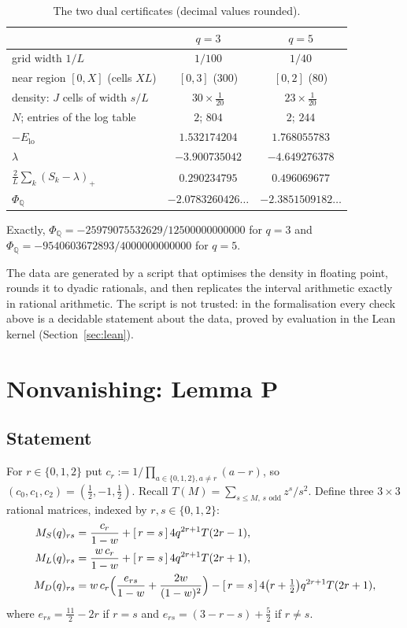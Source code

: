 \documentclass[11pt]{amsart}
\theoremstyle{definition}
\theoremstyle{remark}
\numberwithin{equation}{section}
\newcommand{\ind}[1]{[\,#1\,]}
\begin{document}
\begin{table}[ht]
\centering
\begin{tabular}{@{}lcc@{}}
\toprule
 & $q=3$ & $q=5$\\
\midrule
grid width $1/L$ & $1/100$ & $1/40$\\
near region $[0,X]$ (cells $XL$) & $[0,3]$ ($300$) & $[0,2]$ ($80$)\\
density: $J$ cells of width $s/L$ & $30\times\frac1{20}$ & $23\times\frac1{20}$\\
$N$; entries of the log table & $2$; $804$ & $2$; $244$\\
$-E_{\mathrm{lo}}$ & $1.532174204$ & $1.768055783$\\
$\lambda$ & $-3.900735042$ & $-4.649276378$\\
$\frac2L\sum_k(S_k-\lambda)_+$ & $0.290234795$ & $0.496069677$\\
$\Phi_{\mathbb Q}$ & $-2.0783260426\ldots$ & $-2.3851509182\ldots$\\
\bottomrule
\end{tabular}
\caption{The two dual certificates (decimal values rounded).}\label{tab:cert}
\end{table}

Exactly, $\Phi_{\mathbb Q}=-25979075532629/12500000000000$ for $q=3$ and $\Phi_{\mathbb Q}=-9540603672893/4000000000000$
for $q=5$.

The data are generated by a script that optimises the density in floating point, rounds it to dyadic rationals,
and then replicates the interval arithmetic exactly in rational arithmetic. The script is not trusted: in the
formalisation every check above is a decidable statement about the data, proved by evaluation in the Lean kernel
(Section~\ref{sec:lean}).

\section{Nonvanishing: Lemma P}\label{sec:nonvan}

\subsection{Statement}
For $r\in\{0,1,2\}$ put $c_r:=1/\prod_{a\in\{0,1,2\},a\ne r}(a-r)$, so $(c_0,c_1,c_2)=(\frac12,-1,\frac12)$. Recall
$T(M)=\sum_{s\le M,\,s\text{ odd}}z^s/s^2$. Define three $3\times3$ rational matrices, indexed by $r,s\in\{0,1,2\}$:
\begin{align*}
  M_S(q)_{rs}&=\frac{c_r}{1-w}+\ind{r=s}\,4q^{2r+1}T(2r-1),\\
  M_L(q)_{rs}&=\frac{w\,c_r}{1-w}+\ind{r=s}\,4q^{2r+1}T(2r+1),\\
  M_D(q)_{rs}&=w\,c_r\Bigl(\frac{e_{rs}}{1-w}+\frac{2w}{(1-w)^2}\Bigr)-\ind{r=s}\,4\bigl(r+\tfrac12\bigr)q^{2r+1}T(2r+1),
\end{align*}
where $e_{rs}=\frac{11}2-2r$ if $r=s$ and $e_{rs}=(3-r-s)+\frac52$ if $r\ne s$.
\end{document}
